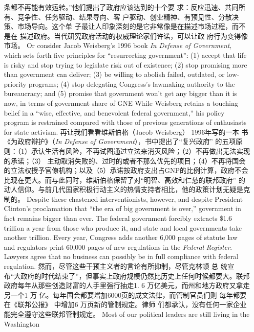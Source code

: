 \begin{paracol}{2}
条都不再能有效运转。”他们提出了政府应该达到的十个要
求：反应迅速、共同所有、竞争性、任务驱动、结果导向、客
户驱动、创业精神、有预见性、分散决策、市场导向。这个单
子最让人印象深刻的是它非常像是在描述市场过程，而不是在
描述政府。当代研究政府活动的权威理论家们许诺，可以让政
府行为变得像市场。
\switchcolumn*
Or consider Jacob Weisberg's 1996 book \textit{In Defense of Government}, which sets forth five principles for ``resurrecting government'': (1) accept that life is risky and stop trying to legislate
risk out of existence; (2) stop promising more than government
can deliver; (3) be willing to abolish failed, outdated, or low-priority programs; (4) stop delegating Congress's lawmaking
authority to the bureaucracy; and (5) promise that government
won't get any bigger than it is now, in terms of government
share of GNE While Weisberg retains a touching belief in a
``wise, effective, and benevolent federal government,'' his policy
program is restrained compared with those of previous generations of enthusiasts for state activism.
\switchcolumn
再让我们看看维斯伯格（Jacob Weisberg） 1996年写的一本 书 《为政府辩护》（\textit{In Defense of Government}），书中提出了“复兴政府” 的五项原则：（1）承认生活有风险，不再试图通过立法来消灭风险；（2）不再做出无法实现的承诺；（3） 主动取消失败的、过时的或者不那么优先的项目；（4）不再将国会的立法权授予官僚机构；以及（5）承诺按政府支出占GNP的比例计算，政府不会比现在更大。而与此同时，维斯伯格保留了对“明智、高效和仁慈的联邦政府” 的动人信仰。与前几代国家积极行动主义的热情支持者相比，他的政策计划无疑是克制的。
\switchcolumn*
Despite these chastened interventionists, however, and despite President Clinton's proclamation that ``the era of big government is over,'' government in fact remains bigger than ever.
The federal government forcibly extracts \$1.6 trillion a year
from those who produce it, and state and local governments
take another trillion. Every year, Congress adds another 6,000 pages of statute law and regulators print 60,000 pages of new
regulations in the\textit{ Federal Register}. Lawyers agree that no business can possibly be in full compliance with federal regulation.
\switchcolumn
然而，尽管这些干预主义者的言论有所抑制，尽管克林顿
总 统宣布“大政府的时代结束了”，但事实上政府规模仍然比历史上任何时候都要大。联邦政府每年从那些创造财富的人手里强行抽走1. 6 万亿美元，而州和地方政府又拿走另一个1 万
亿。每年国会都要增加6000页的成文法律，而管制官员们则
每年都要在《联邦公报》 中增加6 万页新的管制规定。律师
们都承认，没有任何一家企业能完全遵守这些联邦管制规定。
\switchcolumn*
Most of our political leaders are still living in the Washington

\end{paracol}
